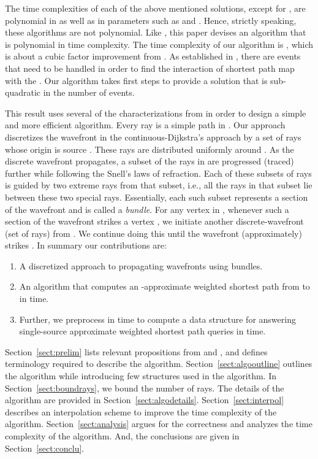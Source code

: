 \documentclass[11pt]{article}
\begin{document}
The time complexities of each of the above mentioned solutions, except for \cite{journals/jacm/MitchellP91}, are polynomial in  as well as in parameters such as  and .
Hence, strictly speaking, these algorithms are not polynomial.
Like \cite{journals/jacm/MitchellP91}, this paper devises an algorithm that is polynomial in time complexity.
The time complexity of our algorithm is , which is about a cubic factor improvement from \cite{journals/jacm/MitchellP91}.
As established in \cite{journals/jacm/MitchellP91}, there are   events that need to be handled in order to find the interaction of shortest path map with the .
Our algorithm takes first steps to provide a solution that is sub-quadratic in the number of events.

This result uses several of the characterizations from \cite{journals/jacm/MitchellP91} in order to design a simple and more efficient algorithm.
Every ray is a simple path in .
Our approach discretizes the wavefront in the continuous-Dijkstra's approach by a set  of rays whose origin is source .
These rays are distributed uniformly around .
As the discrete wavefront propagates, a subset of the rays in  are progressed (traced) further while following the Snell's laws of refraction.
Each of these subsets of rays is guided by two extreme rays from that subset, i.e., all the rays in that subset lie between these two special rays. 
Essentially, each such subset represents a section of the wavefront and is called a {\em bundle}.
For any vertex  in , whenever such a section of the wavefront strikes a vertex , we initiate another discrete-wavefront (set of rays) from .
We continue doing this until the wavefront (approximately) strikes .
In summary our contributions are:
\begin{enumerate}
\item A discretized approach to propagating wavefronts using bundles.
\item
An algorithm that computes an -approximate weighted shortest path from  to  in  time.
\item
Further, we preprocess  in  time to compute a data structure for answering single-source approximate weighted shortest path queries in  time.
\end{enumerate}

Section~\ref{sect:prelim} lists relevant propositions from \cite{journals/jacm/MitchellP91} and \cite{journals/jal/SunR06}, and defines terminology required to describe the algorithm. 
Section~\ref{sect:algooutline} outlines the algorithm while introducing few structures used in the algorithm.
In Section~\ref{sect:boundrays}, we bound the number of rays.
The details of the algorithm are provided in Section~\ref{sect:algodetails}.
Section~\ref{sect:interpol} describes an interpolation scheme to improve the time complexity of the algorithm. 
Section~\ref{sect:analysis} argues for the correctness and analyzes the time complexity of the algorithm.
And, the conclusions are given in Section~\ref{sect:conclu}.
\end{document}
